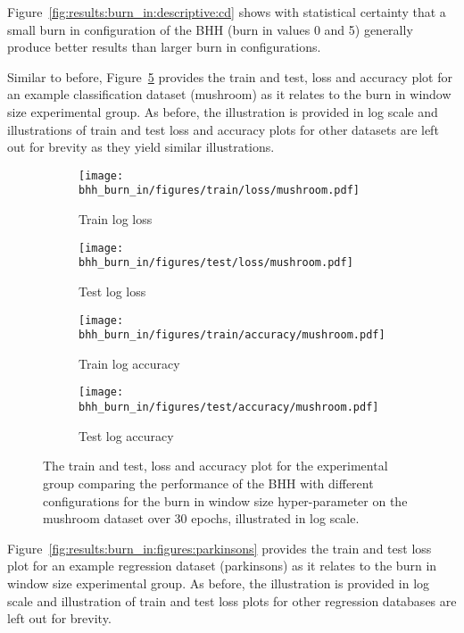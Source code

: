 Figure~\ref{fig:results:burn_in:descriptive:cd} shows with statistical certainty that a small burn in configuration of the \acs{BHH} (burn in values 0 and 5) generally produce better results than larger burn in configurations.


Similar to before, Figure~\ref{fig:results:burn_in:figures:mushroom} provides the train and test, loss and accuracy plot for an example classification dataset (mushroom) as it relates to the burn in window  size experimental group. As before, the illustration is provided in log scale and illustrations of train and test loss and accuracy plots for other datasets are left out for brevity as they yield similar illustrations.

\begin{figure}[H]
	\begin{subfigure}{0.5\textwidth}
		\centering
		\texttt{[image: bhh\_burn\_in/figures/train/loss/mushroom.pdf]}
		\caption{Train log loss}
		\label{fig:results:burn_in:figures:loss:train:mushroom}
	\end{subfigure}
	\begin{subfigure}{0.5\textwidth}
		\centering
		\texttt{[image: bhh\_burn\_in/figures/test/loss/mushroom.pdf]}
		\caption{Test log loss}
		\label{fig:results:burn_in:figures:loss:test:mushroom}
	\end{subfigure}
	\par\bigskip
	\begin{subfigure}{0.5\textwidth}
		\centering
		\texttt{[image: bhh\_burn\_in/figures/train/accuracy/mushroom.pdf]}
		\caption{Train log accuracy}
		\label{fig:results:burn_in:figures:accuracy:train:mushroom}
	\end{subfigure}
	\begin{subfigure}{0.5\textwidth}
		\centering
		\texttt{[image: bhh\_burn\_in/figures/test/accuracy/mushroom.pdf]}
		\caption{Test log accuracy}
		\label{fig:results:burn_in:figures:accuracy:test:mushroom}
	\end{subfigure}
	\par\bigskip
	\caption{The train and test, loss and accuracy plot for the experimental group comparing the performance of the \acs{BHH} with different configurations for the burn in window size hyper-parameter on the mushroom dataset over 30 epochs, illustrated in log scale.}
	\label{fig:results:burn_in:figures:mushroom}
\end{figure}

Figure~\ref{fig:results:burn_in:figures:parkinsons} provides the train and test loss plot for an example regression dataset (parkinsons) as it relates to the burn in window size experimental group. As before, the illustration is provided in log scale and illustration of train and test loss plots for other regression databases are left out for brevity.

